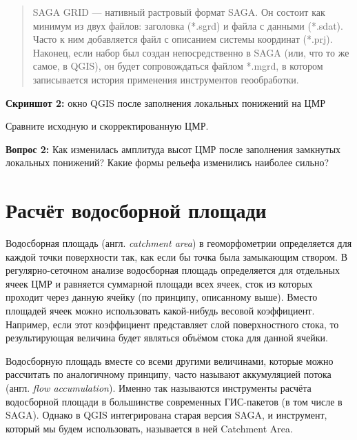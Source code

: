 \documentclass[
  12pt,
]{book}
\begin{document}
\begin{quote}
SAGA GRID --- нативный растровый формат SAGA. Он состоит как минимум из двух файлов: заголовка (*.sgrd) и файла с данными (*.sdat). Часто к ним добавляется файл с описанием системы координат (*.prj). Наконец, если набор был создан непосредственно в SAGA (или, что то же самое, в QGIS), он будет сопровождаться файлом *.mgrd, в котором записывается история применения инструментов геообработки.
\end{quote}

\textbf{Скриншот 2:} окно QGIS после заполнения локальных понижений на ЦМР

Сравните исходную и скорректированную ЦМР.

\textbf{Вопрос 2:} Как изменилась амплитуда высот ЦМР после заполнения замкнутых локальных понижений? Какие формы рельефа изменились наиболее сильно?

\hypertarget{hydrodem-flowacc}{%
\section{Расчёт водосборной площади}\label{hydrodem-flowacc}}

Водосборная площадь (англ. \emph{catchment area}) в геоморфометрии определяется для каждой точки поверхности так, как если бы точка была замыкающим створом. В регулярно-сеточном анализе водосборная площадь определяется для отдельных ячеек ЦМР и равняется суммарной площади всех ячеек, сток из которых проходит через данную ячейку (по принципу, описанному выше). Вместо площадей ячеек можно использовать какой-нибудь весовой коэффициент. Например, если этот коэффициент представляет слой поверхностного стока, то результирующая величина будет являться объёмом стока для данной ячейки.

Водосборную площадь вместе со всеми другими величинами, которые можно рассчитать по аналогичному принципу, часто называют аккумуляцией потока (англ. \emph{flow accumulation}). Именно так называются инструменты расчёта водосборной площади в большинстве современных ГИС-пакетов (в том числе в SAGA). Однако в QGIS интегрирована старая версия SAGA, и инструмент, который мы будем использовать, называется в ней Catchment Area.
\end{document}
